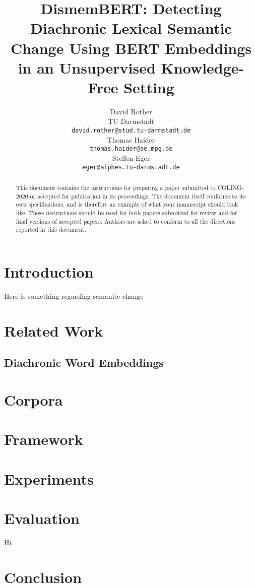 \documentclass[11pt]{article}
\title{DismemBERT: Detecting Diachronic Lexical Semantic Change Using BERT Embeddings in an Unsupervised Knowledge-Free Setting}
\author{David Rother \\
  TU Darmstadt \\
  {\tt david.rother@stud.tu-darmstadt.de} \\\And
  Thomas Haider \\
  {\tt thomas.haider@ae.mpg.de} \\\And
  Steffen Eger \\
  {\tt eger@aiphes.tu-darmstadt.de} \\}
\date{}
\begin{document}
\maketitle
\begin{abstract}
  This document contains the instructions for preparing a paper submitted
  to COLING-2020 or accepted for publication in its proceedings. The document itself
  conforms to its own specifications, and is therefore an example of
  what your manuscript should look like. These instructions should be
  used for both papers submitted for review and for final versions of
  accepted papers. Authors are asked to conform to all the directions
  reported in this document.
\end{abstract}

\section{Introduction}
Here is something regarding semanitc change \cite{schlechtweg2018diachronic}

\section{Related Work}

\subsection{Diachronic Word Embeddings}


\section{Corpora}

\section{Framework}

\section{Experiments}
\section{Evaluation} 
Hi
\section{Conclusion}



\end{document}

